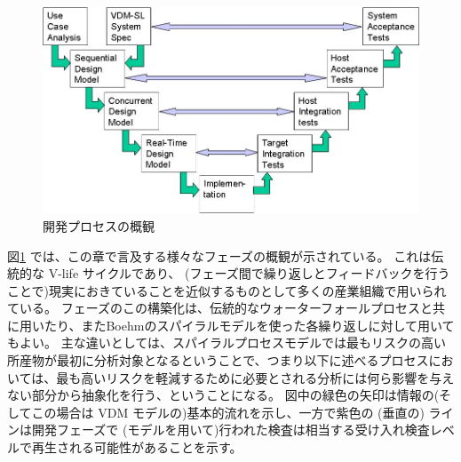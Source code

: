 \documentclass[\pformat,12pt]{jreport}
\begin{document}
\begin{figure}
\begin{center}
\includegraphics[width=\textwidth]{lifecycle}
\end{center}






\caption{開発プロセスの概観}\label{fig:processoverview}
\end{figure}

図\ref{fig:processoverview} では、この章で言及する様々なフェーズの概観が示されている。
これは伝統的な V-life サイクルであり、 (フェーズ間で繰り返しとフィードバックを行うことで)現実におきていることを近似するものとして多くの産業組織で用いられている。
フェーズのこの構築化は、伝統的なウォーターフォールプロセスと共に用いたり、またBoehmのスパイラルモデル\cite{Sommerville82, Boehm88}を使った各繰り返しに対して用いてもよい。
主な違いとしては、スパイラルプロセスモデルでは最もリスクの高い所産物が最初に分析対象となるということで、つまり以下に述べるプロセスにおいては、最も高いリスクを軽減するために必要とされる分析には何ら影響を与えない部分から抽象化を行う、ということになる。
図中の緑色の矢印は情報の(そしてこの場合は VDM モデルの)基本的流れを示し、一方で紫色の (垂直の) ラインは開発フェーズで (モデルを用いて)行われた検査は相当する受け入れ検査レベルで再生される可能性があることを示す。
\end{document}
